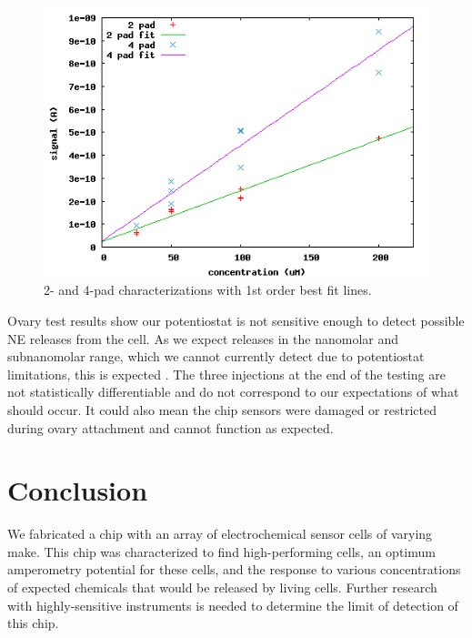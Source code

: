 \documentclass{article}
\begin{document}
\begin{figure}
\centering
\includegraphics[width=\linewidth]{figures/char.png}
\caption{2- and 4-pad characterizations with 1st order best fit lines.}
\label{char}
\end{figure}

Ovary test results show our potentiostat is not sensitive enough to detect possible NE releases from the cell. As we expect releases in the nanomolar and subnanomolar range, which we cannot currently detect due to potentiostat limitations, this is expected \cite{amperometry-review}. The three injections at the end of the testing are not statistically differentiable and do not correspond to our expectations of what should occur. It could also mean the chip sensors were damaged or restricted during ovary attachment and cannot function as expected.

\section{Conclusion}

We fabricated a chip with an array of electrochemical sensor cells of varying make. This chip was characterized to find high-performing cells, an optimum amperometry potential for these cells, and the response to various concentrations of expected chemicals that would be released by living cells. Further research with highly-sensitive instruments is needed to determine the limit of detection of this chip.

{}

\end{document}
